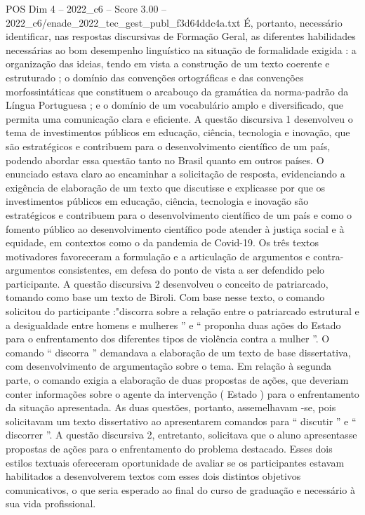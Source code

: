 \begin{textsample}{POS Dim 4 – 2022\_c6 – Score 3.00 – 2022\_c6/enade\_2022\_tec\_gest\_publ\_f3d64ddc4a.txt}
É, portanto, necessário identificar, nas respostas discursivas de Formação Geral, as diferentes habilidades necessárias ao bom desempenho linguístico na situação de formalidade exigida : a organização das ideias, tendo em vista a construção de um texto coerente e estruturado ; o domínio das convenções ortográficas e das convenções morfossintáticas que constituem o arcabouço da gramática da norma-padrão da Língua Portuguesa ; e o domínio de um vocabulário amplo e diversificado, que permita uma comunicação clara e eficiente.
A questão discursiva 1 desenvolveu o tema de investimentos públicos em educação, ciência, tecnologia e inovação, que são estratégicos e contribuem para o desenvolvimento científico de um país, podendo abordar essa questão tanto no Brasil quanto em outros países.
O enunciado estava claro ao encaminhar a solicitação de resposta, evidenciando a exigência de elaboração de um texto que discutisse e explicasse por que os investimentos públicos em educação, ciência, tecnologia e inovação são estratégicos e contribuem para o desenvolvimento científico de um país e como o fomento público ao desenvolvimento científico pode atender à justiça social e à equidade, em contextos como o da pandemia de Covid-19.
Os três textos motivadores favoreceram a formulação e a articulação de argumentos e contra-argumentos consistentes, em defesa do ponto de vista a ser defendido pelo participante.
A questão discursiva 2 desenvolveu o conceito de patriarcado, tomando como base um texto de Biroli.
Com base nesse texto, o comando solicitou do participante :"discorra sobre a relação entre o patriarcado estrutural e a desigualdade entre homens e mulheres ” e “ proponha duas ações do Estado para o enfrentamento dos diferentes tipos de violência contra a mulher ”.
O comando “ discorra ” demandava a elaboração de um texto de base dissertativa, com desenvolvimento de argumentação sobre o tema.
Em relação à segunda parte, o comando exigia a elaboração de duas propostas de ações, que deveriam conter informações sobre o agente da intervenção ( Estado ) para o enfrentamento da situação apresentada.
As duas questões, portanto, assemelhavam -se, pois solicitavam um texto dissertativo ao apresentarem comandos para “ discutir ” e “ discorrer ”.
A questão discursiva 2, entretanto, solicitava que o aluno apresentasse propostas de ações para o enfrentamento do problema destacado.
Esses dois estilos textuais ofereceram oportunidade de avaliar se os participantes estavam habilitados a desenvolverem textos com esses dois distintos objetivos comunicativos, o que seria esperado ao final do curso de graduação e necessário à sua vida profissional.

\end{textsample}
